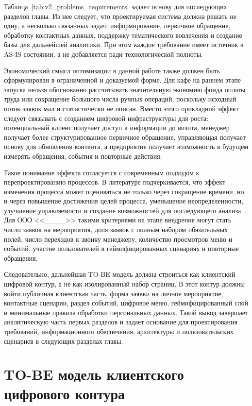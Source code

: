 Таблица~\ref{tab:v2_problems_requirements} задает основу для последующих разделов главы. Из нее следует, что проектируемая система должна решать не одну, а несколько связанных задач: информирование, первичное обращение, обработку контактных данных, поддержку тематического вовлечения и создание базы для дальнейшей аналитики. При этом каждое требование имеет источник в AS-IS состоянии, а не добавляется ради технологической полноты.

Экономический смысл оптимизации в данной работе также должен быть сформулирован в ограниченной и доказуемой форме. Для кафе на раннем этапе запуска нельзя обоснованно рассчитывать значительную экономию фонда оплаты труда или сокращение большого числа ручных операций, поскольку исходный поток заявок мал и статистически не описан. Вместо этого прикладной эффект следует связывать с созданием цифровой инфраструктуры для роста: потенциальный клиент получает доступ к информации до визита, менеджер получает более структурированное первичное обращение, управляющая получает основу для обновления контента, а предприятие получает возможность в будущем измерять обращения, события и повторные действия.

Такое понимание эффекта согласуется с современным подходом к перепроектированию процессов. В литературе подчеркивается, что эффект изменения процесса может оцениваться не только через сокращение времени, но и через повышение достижения целей процесса, уменьшение неопределенности, улучшение управляемости и создание возможностей для последующего анализа~\cite{maruster2009,tsakalidis2024}. Для ООО <<\_\_\_\_>> такими критериями на этапе внедрения могут стать число заявок на мероприятия, доля заявок с полным набором обязательных полей, число переходов к звонку менеджеру, количество просмотров меню и событий, участие пользователей в геймифицированных сценариях и повторные обращения.

Следовательно, дальнейшая TO-BE модель должна строиться как клиентский цифровой контур, а не как изолированный набор страниц. В этот контур должны войти публичная клиентская часть, форма заявки на личное мероприятие, контактные сценарии, раздел событий, цифровое меню, геймифицированный слой и минимальные правила обработки персональных данных. Такой вывод завершает аналитическую часть первых разделов и задает основание для проектирования требований, информационного обеспечения, архитектуры и пользовательских сценариев в следующих разделах главы.

\section{TO-BE модель клиентского цифрового контура}

